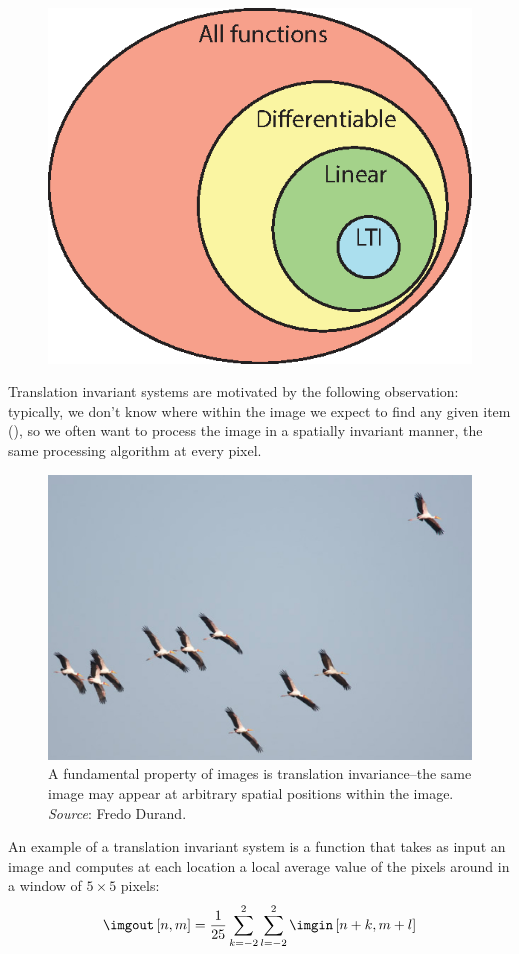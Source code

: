 \begin{figure}
	\centerline{
		\includegraphics[width=.25\linewidth]{figures/linear_image_filtering/space_of_functions.eps}
	}
\end{figure}

Translation invariant systems are motivated by the following observation: typically, we don't know where within the image we expect to find any
given item (\fig{\ref{fig:translationInvar}}), so we often want to process the image in a spatially invariant manner, the same processing algorithm at every pixel.


\begin{figure}
	\centerline{
		\includegraphics[width=1\linewidth]{figures/linear_image_filtering/fredo_birds1.jpg}
	}
	\caption{A fundamental property of images is translation
		invariance--the same image may appear at arbitrary spatial positions
		within the image. {\em Source}: Fredo Durand.}
	\label{fig:translationInvar}
\end{figure}

An example of a translation invariant system is a function that takes as input an image and computes at each location a local average value of the pixels around in a window of $5 \times 5$ pixels:
\begin{equation}
	\imgout \left[n,m \right] = \frac{1}{25} \sum_{k=-2}^{2} \sum_{l=-2}^{2} \imgin \left[n+k,m+l \right]
\end{equation}

